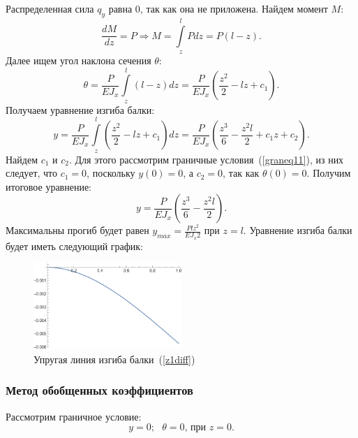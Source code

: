 \documentclass[12pt, a4paper]{article}
\begin{document}
Распределенная сила $q_{y}$ равна  0, так как она не приложена. Найдем момент $M$:
\begin{equation}
	\label{z111}
	\frac{d M}{d z} = P \Rightarrow M = \int\limits_z^l P d z = P(l - z).
\end{equation} 
Далее ищем угол наклона сечения $\theta$:
 \begin{equation}
 	\label{z112}
 	\theta = \frac{P}{E J_{x}} \int\limits_z^l (l - z)d z = \frac{P}{E J_{x}} (\frac{z^2}{2} - l z + c_1).
 \end{equation} 
Получаем уравнение изгиба балки: 
 \begin{equation}
	\label{z112}
	y = \frac{P}{E J_{x}} \int\limits_z^l (\frac{z^2}{2} - l z + c_1) d z = \frac{P}{E J_{x}} (\frac{z^3}{6} - \frac{z^2 l}{2} + c_1 z + c_2).
\end{equation}
Найдем $c_1$ и $c_2$. Для этого рассмотрим граничные условия~(\ref{graneq11}), из них следует, что $c_1 = 0$, поскольку $y(0) = 0$, а $c_2 = 0$, так как $\theta(0) = 0$. Получим итоговое уравнение: 
\begin{equation}
	\label{z1diff}
	y = \frac{P}{E J_{x}} (\frac{z^3}{6} - \frac{z^2 l}{2}).
\end{equation}
Максимальны прогиб будет равен $y_{max} = \frac{P l z^2}{E J_{x} 2}$ при $z = l$. Уравнение изгиба балки будет иметь следующий график:
\begin{figure}[!h]
	\centering
	\includegraphics[width=0.5\textwidth]{g.1}%
	\caption{Упругая линия изгиба балки~(\ref{z1diff})}
	\vspace*{-2mm}
	\label{g1}
\end{figure}

\subsubsection{Метод обобщенных коэффициентов}
Рассмотрим граничное условие:
\begin{equation}
	\label{graneq11}
	y = 0;\mbox{ } \theta = 0\mbox{, при } z = 0.
\end{equation}
\end{document}
